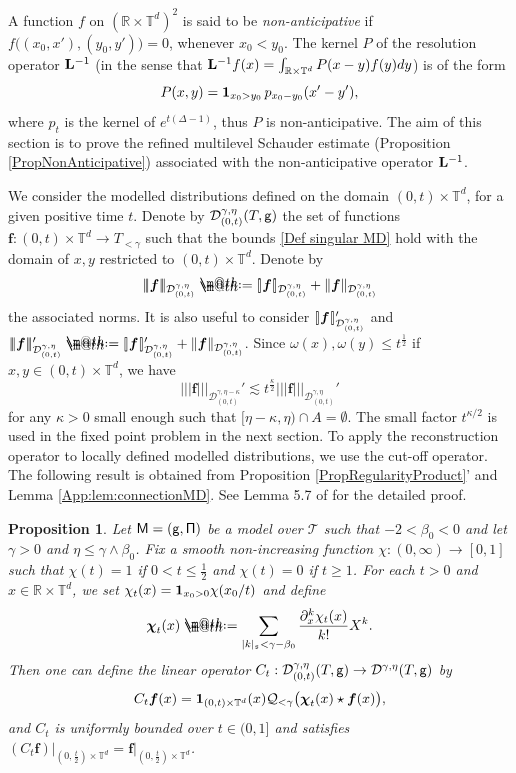 \documentclass[10pt, reqno]{amsart}
\makeatletter
\numberwithin{subsection}{section}
\numberwithin{subsubsection}{subsection}
\numberwithin{equation}{section} %
\theoremstyle{mystyle}
\newtheorem{prop}[thm]{\hspace{-0.13cm} {Proposition}}%
\theoremstyle{mystyle2}
\theoremstyle{mystyle3}
\newcommand{\trino}[1]{|\!|\!|#1|\!|\!|}
\newcommand{\brarb}[1]{[\hspace{-0.5mm}]#1[\hspace{-0.5mm}]}
\newcommand{\bsf}{\boldsymbol{f}}
\newcommand{\mfs}{\mathfrak{s}}
\newcommand\bbR{\mathbb{R}}
\newcommand{\bbT}{\mathbb{T}}
\newcommand{\mcD}{\mathcal{D}}
\newcommand{\mcQ}{\mathcal{Q}}
\newcommand*{\defeq}{\mathrel{\rlap{%
                     \raisebox{0.3ex}{$\m@th\cdot$}}%
                     \raisebox{-0.3ex}{$\m@th\cdot$}}%
                     =}
\makeatother
\begin{document}
A function $f$ on $(\bbR\times\bbT^d)^2$ is said to be {\it non-anticipative} if $f\big((x_0,x'),(y_0,y')\big)=0$, whenever $x_0<y_0$. The kernel {\color{red}$P$} of the resolution operator ${\bf L}^{-1}$ (in the sense that ${\bf L}^{-1}f(x)=\int_{\bbR\times\bbT^d}P(x-y)f(y)dy$) is of the form
$$
P(x,y)={\bf1}_{x_0>y_0}\,p_{x_0-y_0}(x'-y'),
$$
where $p_t$ is the kernel of $e^{t(\Delta-1)}$, thus $P$ is non-anticipative. The aim of this section is to prove the refined multilevel Schauder estimate (Proposition \ref{PropNonAnticipative}) associated with the non-anticipative operator ${\bf L}^{-1}$.

\medskip

We consider the modelled distributions defined on the domain $(0,t)\times\bbT^d$, for a given positive time $t$. Denote by $\mcD_{(0,t)}^{\gamma,\eta}(T,\sf g)$ the set of functions $\bsf : (0,t)\times\bbT^d \to T_{<\gamma}$ such that the bounds \eqref{Def singular MD} hold with the domain of $x,y$ restricted to $(0,t)\times\bbT^d $. Denote by
$$
\trino{\bsf}_{\mcD_{(0,t)}^{\gamma,\eta}} \defeq  \brarb{\bsf}_{\mcD_{(0,t)}^{\gamma,\eta}} + \|\bsf\|_{\mcD_{(0,t)}^{\gamma,\eta}}
$$ 
the associated norms. It is also useful to consider $\brarb{\bsf}_{\mcD_{(0,t)}^{\gamma,\eta}}'$ and $|\!|\!| \bsf |\!|\!|_{\mcD_{(0,t)}^{\gamma,\eta}}' \defeq \brarb{\bsf}_{\mcD_{(0,t)}^{\gamma,\eta}}'+ \|\bsf\|_{\mcD_{(0,t)}^{\gamma,\eta}}$. Since $\omega(x),\omega(y)\le t^{\frac12}$ if $x,y\in(0,t)\times\bbT^d$, we have
$$
|\!|\!| \bsf |\!|\!|_{\mcD_{(0,t)}^{\gamma,\eta-\kappa}}'\lesssim t^{\frac\kappa2}|\!|\!| \bsf |\!|\!|_{\mcD_{(0,t)}^{\gamma,\eta}}'
$$
for any $\kappa>0$ small enough such that $[\eta-\kappa,\eta)\cap A=\emptyset$. The small factor $t^{\kappa/2}$ is used in the fixed point problem in the next section. To apply the reconstruction operator to locally defined modelled distributions, we use the cut-off operator.
The following result is obtained from Proposition \ref{PropRegularityProduct}' and Lemma \ref{App:lem:connectionMD}. See Lemma 5.7 of \cite{HT24} for the detailed proof.

\medskip

\begin{prop}
Let $\sf M=(g,\Pi)$ be a model over $\mathscr{T}$ such that $-2<\beta_0<0$ and let $\gamma>0$ and $\eta\le\gamma\wedge\beta_0$.
Fix a smooth non-increasing function $\chi:(0,\infty)\to[0,1]$ such that $\chi(t)=1$ if $0<t\le\frac12$ and $\chi(t)=0$ if $t\ge1$.
For each $t>0$ and $x\in\bbR\times\bbT^d$, we set $\chi_t(x)={\bf1}_{x_0>0}\chi(x_0/t)$ and define
$$
\boldsymbol{\chi}_t(x)\defeq\sum_{|k|_\mfs<\gamma-\beta_0}\frac{\partial_x^k\chi_t(x)}{k!}X^k.
$$
Then one can define the linear operator $C_t:\mcD^{\gamma,\eta}_{(0,t)}(T,{\sf g})\to\mcD^{\gamma,\eta}(T,{\sf g})$ by
$$
C_t\bsf(x)={\bf1}_{(0,t)\times\bbT^d}(x)\mcQ_{<\gamma}\big(\boldsymbol{\chi}_t(x)\star\bsf(x)\big),
$$
and $C_t$ is uniformly bounded over $t\in(0,1]$ and satisfies $(C_t\bsf)\vert_{(0,\frac{t}2)\times\bbT^d}= \bsf\vert_{(0,\frac{t}2)\times\bbT^d}$.
\end{prop}
\end{document}
